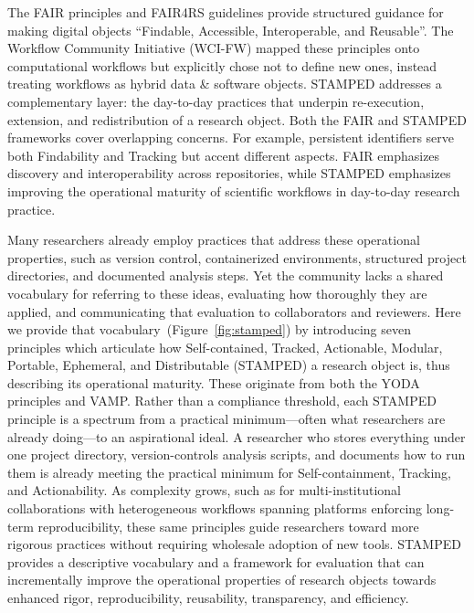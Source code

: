 \documentclass{article}
\begin{document}
The FAIR principles\cite{wilkinson_fair_2016} and FAIR4RS guidelines\cite{barker_introducing_2022} provide structured guidance for making digital objects ``Findable, Accessible, Interoperable, and Reusable''.
The Workflow Community Initiative (WCI-FW)\cite{wilkinson_applying_2025} mapped these principles onto computational workflows but explicitly chose not to define new ones, instead treating workflows as hybrid data \& software objects.
STAMPED addresses a complementary layer: the day-to-day practices that underpin re-execution, extension, and redistribution of a research object.
Both the FAIR and STAMPED frameworks cover overlapping concerns.
For example, persistent identifiers serve both Findability and Tracking but accent different aspects.
FAIR emphasizes discovery and interoperability across repositories, while STAMPED emphasizes improving the operational maturity of scientific workflows in day-to-day research practice.

Many researchers already employ practices that address these operational properties, such as version control, containerized environments, structured project directories, and documented analysis steps.
Yet the community lacks a shared vocabulary for referring to these ideas, evaluating how thoroughly they are applied, and communicating that evaluation to collaborators and reviewers.
Here we provide that vocabulary~(Figure~\ref{fig:stamped}) by introducing seven principles which articulate how Self-contained, Tracked, Actionable, Modular, Portable, Ephemeral, and Distributable (STAMPED) a research object is, thus describing its operational maturity.
These originate from both the YODA principles\cite{hanke_yoda_2018} and VAMP\cite{hanke_what_2023}.
Rather than a compliance threshold, each STAMPED principle is a spectrum from a practical minimum---often what researchers are already doing---to an aspirational ideal.
A researcher who stores everything under one project directory, version-controls analysis scripts, and documents how to run them is already meeting the practical minimum for Self-containment, Tracking, and Actionability.
As complexity grows, such as for multi-institutional collaborations with heterogeneous workflows spanning platforms enforcing long-term reproducibility, these same principles guide researchers toward more rigorous practices without requiring wholesale adoption of new tools.
STAMPED provides a descriptive vocabulary and a framework for evaluation that can incrementally improve the operational properties of research objects towards enhanced rigor, reproducibility, reusability, transparency, and efficiency.
\end{document}

